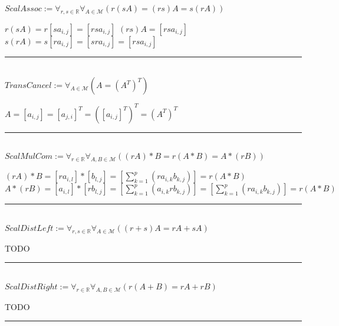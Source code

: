 \documentclass{book}
\newcommand{\abr}{:=}
\newcommand{\pr}[1]{\left(#1\right)}
\begin{document}
$ScalAssoc \abr \forall_{r, s \in \mathbb{R}} \forall_{A \in \mathcal{M}}\pr{r (s A) = (r s) A = s (r A)}$
\begin{enumerate}
  \lit $r (s A) = r [s a_{i, j}] = [r s a_{i, j}]$
  \lit $(r s) A = [r s a_{i, j}]$
  \lit $s (r A) = s [r a_{i, j}] = [s r a_{i, j}] = [r s a_{i, j}]$
\end{enumerate} \vspace{.75mm} \hrule \vspace{.75mm} \ \\ 

$TransCancel \abr \forall_{A \in \mathcal{M}}\pr{A = (A^T)^T}$
\begin{enumerate}
  \lit $A = [a_{i, j}] = [a_{j, i}]^T = ([a_{i, j}]^T)^T = (A^T)^T$
\end{enumerate} \vspace{.75mm} \hrule \vspace{.75mm} \ \\ 

$ScalMulCom \abr \forall_{r \in \mathbb{R}} \forall_{A, B \in \mathcal{M}}\pr{(r A) * B = r (A * B) = A * (r B)}$
\begin{enumerate}
  \lit $(r A) * B = [r a_{i, l}] * [b_{l, j}] = \left[\sum_{k = 1}^{p}(r a_{i, k} b_{k, j})\right] = r (A * B)$
  \lit $A * (r B) = [a_{i, l}] * [r b_{l, j}] = \left[\sum_{k = 1}^{p}(a_{i, k} r b_{k, j})\right] = \left[\sum_{k = 1}^{p}(r a_{i, k} b_{k, j})\right] = r (A * B)$
\end{enumerate} \vspace{.75mm} \hrule \vspace{.75mm} \ \\ 

$ScalDistLeft \abr \forall_{r, s \in \mathbb{R}} \forall_{A \in \mathcal{M}}\pr{(r + s) A = r A + s A}$
\begin{enumerate}
  \lit TODO
\end{enumerate} \vspace{.75mm} \hrule \vspace{.75mm} \ \\ 

$ScalDistRight \abr \forall_{r \in \mathbb{R}} \forall_{A, B \in \mathcal{M}}\pr{r (A + B) = r A + r B}$
\begin{enumerate}
  \lit TODO
\end{enumerate} \vspace{.75mm} \hrule \vspace{.75mm} \ \\ 
\end{document}

